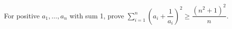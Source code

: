 For positive $a_1,\ldots,a_n$ with sum 1, prove $\displaystyle\sum_{i=1}^n(a_i+\dfrac{1}{a_i})^2\ge\dfrac{(n^2+1)^2}{n}$.

